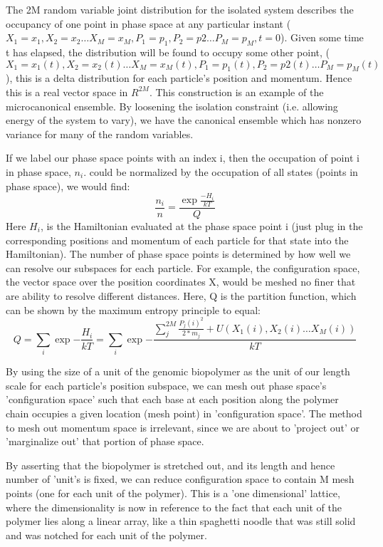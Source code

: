   The 2M random variable joint distribution for the isolated system describes the occupancy of one point in phase space at any particular instant ($X_1=x_1,X_2=x_2\dotsc X_M=x_M, P_1=p_1,P_2=p2\dotsc P_M= p_M,t=0$).  Given some time t has elapsed, the distribution will be found to occupy some other point, ($X_1=x_1(t),X_2=x_2(t)\dotsc X_M=x_M(t), P_1=p_1(t),P_2=p2(t)\dotsc P_M=p_M(t)$), this is a delta distribution for each particle's position and momentum\cite{vankampen}.  Hence this is a real vector space in $R^{2M}$.
     This construction is an example of the microcanonical ensemble.  By loosening the isolation constraint (i.e. allowing energy of the system to vary), we have the canonical ensemble which has nonzero variance for many of the random variables.

 If we label our phase space points with an index i, then the occupation of point i in phase space, $n_i$. could be normalized by the occupation of all states (points in phase space), we would find:
    \begin{equation}\label{}
   \frac{ n_i}{n} =\frac{ \exp\frac{-H_i}{kT} }{ Q }
  \end{equation}
  Here $H_i$, is the Hamiltonian evaluated at the phase space point i (just plug in the corresponding positions and momentum of each particle for that state into the Hamiltonian).  The number of phase space points is determined by how well we can resolve our subspaces for each particle.  For example, the configuration space, the vector space over the position coordinates X, would be meshed no finer that are ability to resolve different distances.  Here, Q is the partition function, which can be shown by the maximum entropy principle to equal:
  \begin{equation}\label{}
     Q= \sum_i \exp{-\frac{H_i}{kT}} = \sum_i \exp{-\frac{ \sum_j^{2M} \frac{P_j(i)^2}{2*m_j} + U(X_1(i), X_2(i)\dotsc X_M(i))}{kT} }
  \end{equation}

By using the size of a unit of the genomic biopolymer as the unit of our length scale for each particle's position subspace, we can mesh out phase space's 'configuration space' such that each base at each position along the polymer chain occupies a given location (mesh point) in 'configuration space'.  The method to mesh out momentum space is irrelevant, since we are about to 'project out' or 'marginalize out' that portion of phase space.  

By asserting that the biopolymer is stretched out, and its length and hence number of 'unit's is fixed, we can reduce configuration space to contain M mesh points (one for each unit of the polymer).  This is a 'one dimensional' lattice, where the dimensionality is now in reference to the fact that each unit of the polymer lies along a linear array, like a thin spaghetti noodle that was still solid and was notched for each unit of the polymer.

